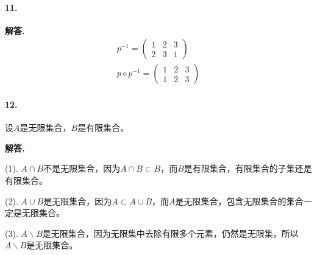 \documentclass[12pt, a4paper, oneside]{ctexart}
\newenvironment{solution}{\par\noindent\textbf{解答. }}{\bigskip\par}
\begin{document}
\paragraph{11.}\begin{solution}
    \begin{equation*}
        \begin{aligned}
            p^{-1} = 
            \begin{pmatrix}
                1&2&3\\
                2&3&1
            \end{pmatrix}\\
            p\diamond p^{-1} = 
            \begin{pmatrix}
                1&2&3\\
                1&2&3
            \end{pmatrix}
        \end{aligned}
    \end{equation*}
\end{solution}
\paragraph{12.}设$A$是无限集合，$B$是有限集合。
\begin{solution}

    (1). $A\cap B$不是无限集合，因为$A\cap B\subset B$，而$B$是有限集合，有限集合的子集还是有限集合。

    (2). $A\cup B$是无限集合，因为$A\subset A\cup B$，而$A$是无限集合，包含无限集合的集合一定是无限集合。

    (3). $A\backslash B$是无限集合，因为无限集中去除有限多个元素，仍然是无限集，所以$A\backslash B$是无限集合。
\end{solution}
\end{document}
